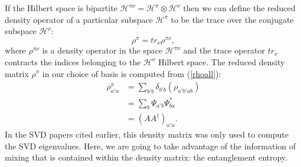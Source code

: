 If the Hilbert space is bipartite $\mathcal{H}^{\pi\nu} = \mathcal{H}^\pi \otimes \mathcal{H}^\nu$ 
then we can define the reduced density operator of a particular subspace $\mathcal{H}^\pi$ to be
the trace over the conjugate subspace $\mathcal{H}^\nu$:
\begin{equation}
    \rho^\pi = tr_\nu \rho^{\pi\nu},
\end{equation}
where $\rho^{\pi\nu}$ is a density operator in the space $\mathcal{H}^{\pi\nu}$
and the trace operator $tr_\nu$ contracts the indices belonging to the $\mathcal{H}^\nu$
Hilbert space.
The reduced density matrix $\rho^\pi$ in our choice of basis is computed from
(\ref{rhoall}):
\begin{equation}\begin{split}\label{matprod}
    \rho_{a'a}^{\pi} &= \sum_{b'b}\delta_{b'b} (\rho_{a'b'ab}) \\
        &=\sum_b {\Psi}_{a'b}{\Psi}^*_{ba}\\
        &=(AA^\dagger)_{a'a}.
\end{split}\end{equation}
In the SVD papers cited earlier, this density matrix was only used to 
compute the SVD eigenvalues. Here, we are going to take advantage of the information
of mixing that is contained within the density matrix: the entanglement entropy.

